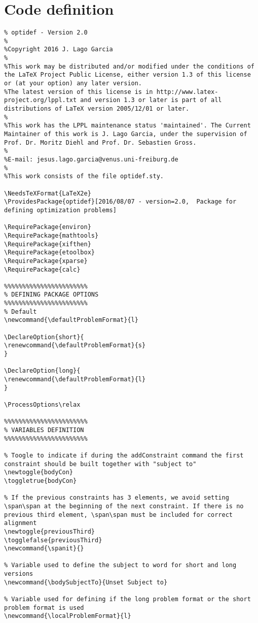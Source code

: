 \documentclass[a4paper]{article}
\begin{document}
\section{Code definition}
\begin{lstlisting}
% optidef - Version 2.0
%
%Copyright 2016 J. Lago Garcia
%
%This work may be distributed and/or modified under the conditions of the LaTeX Project Public License, either version 1.3 of this license or (at your option) any later version.
%The latest version of this license is in http://www.latex-project.org/lppl.txt and version 1.3 or later is part of all distributions of LaTeX version 2005/12/01 or later.
%
%This work has the LPPL maintenance status 'maintained'. The Current Maintainer of this work is J. Lago Garcia, under the supervision of Prof. Dr. Moritz Diehl and Prof. Dr. Sebastien Gross.
%
%E-mail: jesus.lago.garcia@venus.uni-freiburg.de
%
%This work consists of the file optidef.sty.

\NeedsTeXFormat{LaTeX2e}
\ProvidesPackage{optidef}[2016/08/07 - version=2.0,  Package for defining optimization problems]

\RequirePackage{environ}
\RequirePackage{mathtools}	
\RequirePackage{xifthen}	
\RequirePackage{etoolbox}	
\RequirePackage{xparse}	
\RequirePackage{calc}	

%%%%%%%%%%%%%%%%%%%%%%%
% DEFINING PACKAGE OPTIONS
%%%%%%%%%%%%%%%%%%%%%%%
% Default
\newcommand{\defaultProblemFormat}{l}

\DeclareOption{short}{
\renewcommand{\defaultProblemFormat}{s}
}

\DeclareOption{long}{
\renewcommand{\defaultProblemFormat}{l}
}

\ProcessOptions\relax

%%%%%%%%%%%%%%%%%%%%%%%
% VARIABLES DEFINITION
%%%%%%%%%%%%%%%%%%%%%%%

% Toogle to indicate if during the addConstraint command the first constraint should be built together with "subject to"
\newtoggle{bodyCon}
\toggletrue{bodyCon}

% If the previous constraints has 3 elements, we avoid setting \span\span at the beginning of the next constraint. If there is no previous third element, \span\span must be included for correct alignment
\newtoggle{previousThird}
\togglefalse{previousThird}
\newcommand{\spanit}{}

% Variable used to define the subject to word for short and long versions
\newcommand{\bodySubjectTo}{Unset Subject to}

% Variable used for defining if the long problem format or the short problem format is used
\newcommand{\localProblemFormat}{l}


\end{lstlisting}
\end{document}
